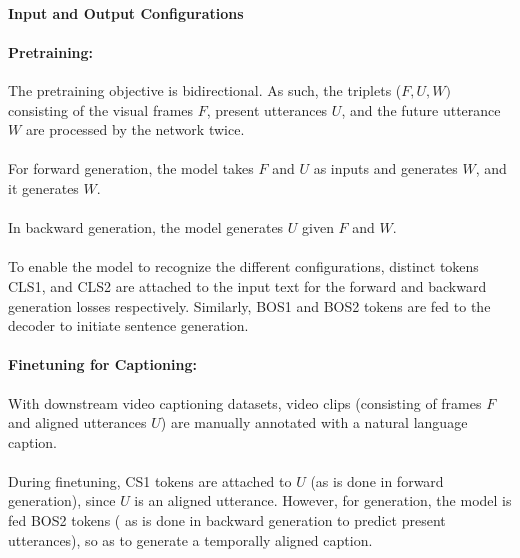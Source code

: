 \documentclass{article}
\begin{document}
\paragraph{Input and Output Configurations}

\paragraph{Pretraining:} The pretraining objective is bidirectional. As such, 
the triplets ($F, U, W)$ consisting
of the visual frames $F$, present utterances $U$, and the future utterance $W$ are processed by the network
twice.  

\paragraph{}For forward generation, the model takes $F$ and $U$ as inputs and generates $W$, and it 
generates $W$.

\paragraph{}In backward generation, the model generates $U$ given $F$ and $W$.

\paragraph{}To enable the model to recognize the different configurations, distinct tokens CLS1, and CLS2
are attached to the input text for the forward and backward generation losses respectively. Similarly,
BOS1 and BOS2 tokens are fed to the decoder to initiate sentence generation.

\paragraph{Finetuning for Captioning:}With downstream video captioning datasets, video clips (consisting of 
frames $F$ and aligned utterances $U$) are manually annotated with a natural language caption.

\paragraph{}During finetuning, CS1 tokens are attached to $U$ (as is done in forward generation),
since $U$ is an aligned utterance. However, for generation, the model is fed BOS2 tokens (
as is done in backward generation to predict present utterances), so as to generate a temporally
aligned caption.
\end{document}
